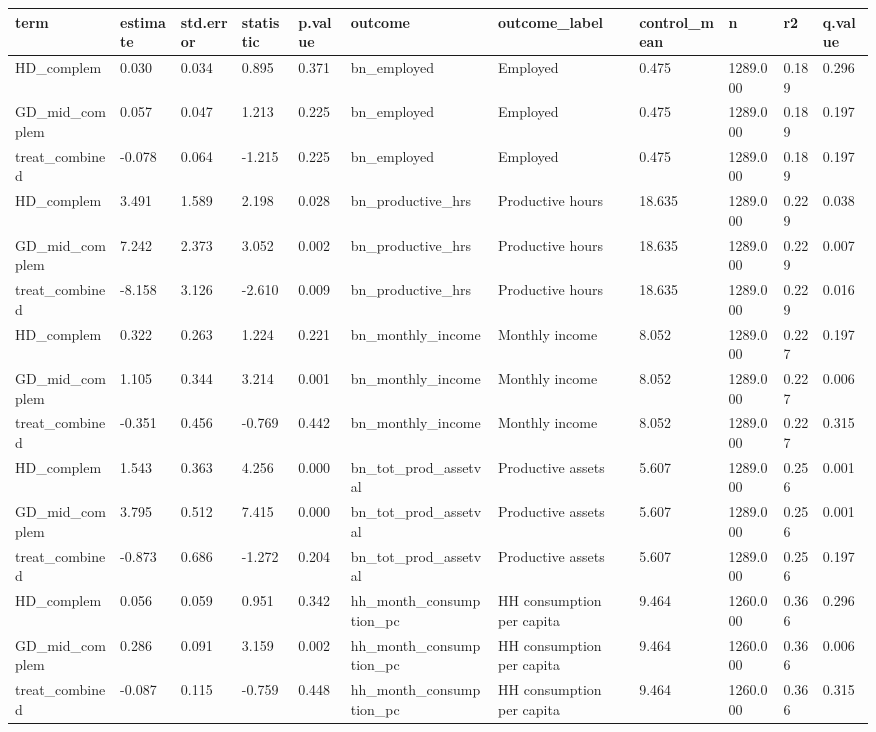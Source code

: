 \begin{tabular}{lllllllllll}
\toprule
term & estimate & std.error & statistic & p.value & outcome & outcome\_label & control\_mean & n & r2 & q.value
 \\
\midrule
HD\_complem & 0.030 & 0.034 & 0.895 & 0.371 & bn\_employed & Employed & 0.475 & 1289.000 & 0.189 & 0.296 \\
GD\_mid\_complem & 0.057 & 0.047 & 1.213 & 0.225 & bn\_employed & Employed & 0.475 & 1289.000 & 0.189 & 0.197 \\
treat\_combined & -0.078 & 0.064 & -1.215 & 0.225 & bn\_employed & Employed & 0.475 & 1289.000 & 0.189 & 0.197 \\
HD\_complem & 3.491 & 1.589 & 2.198 & 0.028 & bn\_productive\_hrs & Productive hours & 18.635 & 1289.000 & 0.229 & 0.038 \\
GD\_mid\_complem & 7.242 & 2.373 & 3.052 & 0.002 & bn\_productive\_hrs & Productive hours & 18.635 & 1289.000 & 0.229 & 0.007 \\
treat\_combined & -8.158 & 3.126 & -2.610 & 0.009 & bn\_productive\_hrs & Productive hours & 18.635 & 1289.000 & 0.229 & 0.016 \\
HD\_complem & 0.322 & 0.263 & 1.224 & 0.221 & bn\_monthly\_income & Monthly income & 8.052 & 1289.000 & 0.227 & 0.197 \\
GD\_mid\_complem & 1.105 & 0.344 & 3.214 & 0.001 & bn\_monthly\_income & Monthly income & 8.052 & 1289.000 & 0.227 & 0.006 \\
treat\_combined & -0.351 & 0.456 & -0.769 & 0.442 & bn\_monthly\_income & Monthly income & 8.052 & 1289.000 & 0.227 & 0.315 \\
HD\_complem & 1.543 & 0.363 & 4.256 & 0.000 & bn\_tot\_prod\_assetval & Productive assets & 5.607 & 1289.000 & 0.256 & 0.001 \\
GD\_mid\_complem & 3.795 & 0.512 & 7.415 & 0.000 & bn\_tot\_prod\_assetval & Productive assets & 5.607 & 1289.000 & 0.256 & 0.001 \\
treat\_combined & -0.873 & 0.686 & -1.272 & 0.204 & bn\_tot\_prod\_assetval & Productive assets & 5.607 & 1289.000 & 0.256 & 0.197 \\
HD\_complem & 0.056 & 0.059 & 0.951 & 0.342 & hh\_month\_consumption\_pc & HH consumption per capita & 9.464 & 1260.000 & 0.366 & 0.296 \\
GD\_mid\_complem & 0.286 & 0.091 & 3.159 & 0.002 & hh\_month\_consumption\_pc & HH consumption per capita & 9.464 & 1260.000 & 0.366 & 0.006 \\
treat\_combined & -0.087 & 0.115 & -0.759 & 0.448 & hh\_month\_consumption\_pc & HH consumption per capita & 9.464 & 1260.000 & 0.366 & 0.315 \\
\bottomrule
\end{tabular}
